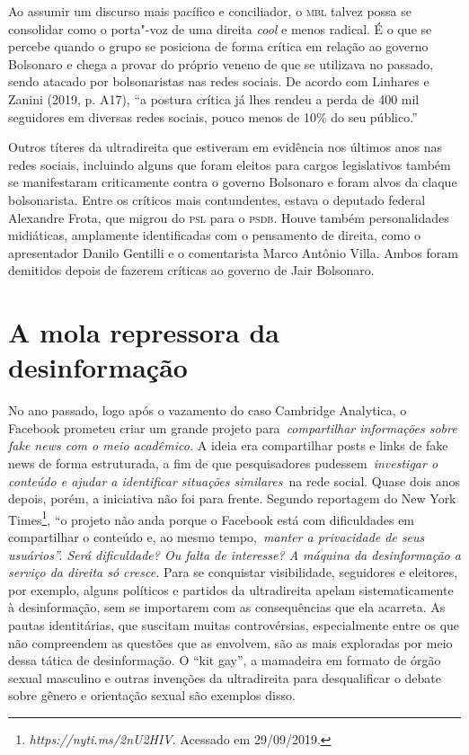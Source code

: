 Ao assumir um discurso mais pacífico e conciliador, o \textsc{mbl} talvez possa
se consolidar como o porta"-voz de uma direita \emph{cool} e menos
radical. É o que se percebe quando o grupo se posiciona de forma crítica
em relação ao governo Bolsonaro e chega a provar do próprio veneno de
que se utilizava no passado, sendo atacado por bolsonaristas nas redes
sociais. De acordo com Linhares e Zanini (2019, p. A17), ``a postura
crítica já lhes rendeu a perda de 400 mil seguidores em diversas redes
sociais, pouco menos de 10\% do seu público.''

Outros títeres da ultradireita que estiveram em evidência nos últimos
anos nas redes sociais, incluindo alguns que foram eleitos para cargos
legislativos também se manifestaram criticamente contra o governo
Bolsonaro e foram alvos da claque bolsonarista. Entre os críticos mais
contundentes, estava o deputado federal Alexandre Frota, que migrou do
\textsc{psl} para o \textsc{psdb}. Houve também personalidades midiáticas, amplamente
identificadas com o pensamento de direita, como o apresentador Danilo
Gentilli e o comentarista Marco Antônio Villa. Ambos foram demitidos
depois de fazerem críticas ao governo de Jair Bolsonaro.

\section{A mola repressora da desinformação}

No ano passado, logo após o vazamento do caso Cambridge Analytica, o
Facebook prometeu criar um grande projeto para~\emph{compartilhar
informações sobre fake news com o meio acadêmico.} A ideia era
compartilhar posts e links de fake news de forma estruturada, a fim de
que pesquisadores pudessem~\emph{investigar o conteúdo e ajudar a
identificar situações similares~}na rede social. Quase dois anos depois,
porém, a iniciativa não foi para frente. Segundo reportagem do New York
Times\footnote{\emph{https://nyti.ms/2nU2HIV}.
  Acessado em 29/09/2019.}, ``o projeto não anda porque o Facebook está
com dificuldades em compartilhar o conteúdo e, ao mesmo
tempo,~\emph{manter a privacidade de seus usuários''. Será
dificuldade? Ou falta de interesse? A máquina da desinformação a serviço
da direita só cresce.} Para se conquistar visibilidade, seguidores e
eleitores, por exemplo, alguns políticos e partidos da ultradireita
apelam sistematicamente à desinformação, sem se importarem com as
consequências que ela acarreta. As pautas identitárias, que suscitam
muitas controvérsias, especialmente entre os que não compreendem as
questões que as envolvem, são as mais exploradas por meio dessa tática
de desinformação. O ``kit gay'', a mamadeira em formato de órgão sexual
masculino e outras invenções da ultradireita para desqualificar o debate
sobre gênero e orientação sexual são exemplos disso.

